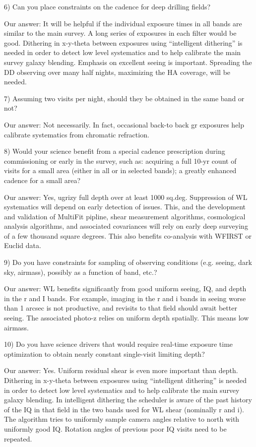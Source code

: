 6) Can you place constraints on the cadence for deep drilling fields?

Our answer: It will be helpful if the individual exposure times in all bands are similar to the main survey. A long series of exposures in each filter would be good. Dithering in x-y-theta between exposures using “intelligent dithering” is needed in order to detect low level systematics and to help calibrate the main survey galaxy blending. Emphasis on excellent seeing is important. Spreading the DD observing over many half nights, maximizing the HA coverage, will be needed.

7) Assuming two visits per night, should they be obtained in the same band or not?

Our answer: Not necessarily. In fact, occasional back-to back gr exposures help calibrate systematics from chromatic refraction.

8) Would your science benefit from a special cadence prescription during commissioning or 
early in the survey, such as: acquiring a full 10-yr count of visits for a small area (either in all or in selected bands); a greatly enhanced cadence for a small area?

Our answer: Yes, ugrizy full depth over at least 1000 sq.deg. Suppression of WL systematics will depend on early detection of issues. This, and the development and validation of MultiFit pipline, shear measurement algorithms, cosmological analysis algorithms, and associated covariances will rely on early deep surveying of a few thousand square degrees. This also benefits co-analysis with WFIRST or Euclid data.

9) Do you have constraints for sampling of observing conditions (e.g. seeing, dark sky,
airmass), possibly as a function of band, etc.?

Our answer: WL benefits significantly from good uniform seeing, IQ, and depth in the r and I bands. For example, imaging in the r and i bands in seeing worse than 1 arcsec is not productive, and revisits to that field should await better seeing. The associated photo-z relies on uniform depth spatially. This means low airmass.

10) Do you have science drivers that would require real-time exposure time optimization 
to obtain nearly constant single-visit limiting depth?

Our answer: Yes. Uniform residual shear is even more important than depth. Dithering in x-y-theta between exposures using “intelligent dithering” is needed in order to detect low level systematics and to help calibrate the main survey galaxy blending. In intelligent dithering the scheduler is aware of the past history of the IQ in that field in the two bands used for WL shear (nominally r and i). The algorithm tries to uniformly sample camera angles relative to north with uniformly good IQ. Rotation angles of previous poor IQ visits need to be repeated.


